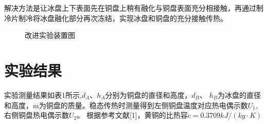 \documentclass{article}
\begin{document}
       
       解决方法是让冰盘上下表面先在铜盘上稍有融化与铜盘表面充分相接触，再通过制冷片制冷将冰盘融化部分再次冻结，实现冰盘和铜盘的充分接触传热。
\begin{figure}
	\centering
	
	
	\caption{\heiti{}改进实验装置图}
	
\end{figure}
\section{实验结果}
实验测量结果如表1所示,$ d_A $、$ h_A $分别为铜盘的直径和高度，$ d_B $、
$ h_B $为冰盘的直径和高度，m为铜盘的质量。稳态传热时测量得到左侧铜盘温度对应热电偶示数$ U_1$,右侧铜盘热电偶示数$ U_2 $。  根据参考文献[1]，黄铜的比热容$ c=0.3709kJ/(kg\cdot K) $
\end{document}
